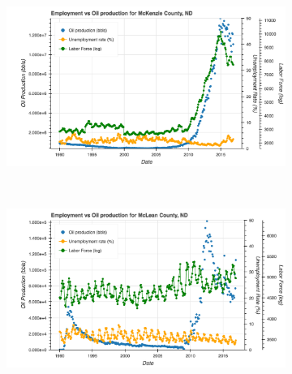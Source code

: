 \documentclass[11pt,letterpaper]{article}
\begin{document}
\begin{figure}
\begin{subfigure}{0.45\textwidth}
\includegraphics[width=1.1\linewidth]{nd_mckenzie_oil_prod}
\end{subfigure}
~
\begin{subfigure}{0.45\textwidth}
\includegraphics[width=1.1\linewidth]{nd_mclean_oil_prod}
\end{subfigure}


\end{figure}
\end{document}
